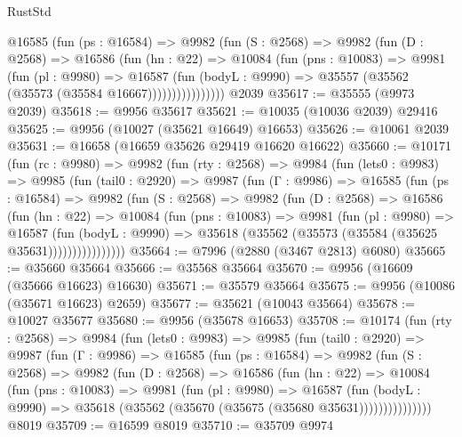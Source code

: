 \begin{lexlean}{RustStd}
\begin{coremodule}
              @16585
                (fun (ps : @16584) =>
                @9982
                  (fun (S : @2568) =>
                  @9982
                    (fun (D : @2568) =>
                    @16586
                      (fun (hn : @22) =>
                      @10084
                        (fun (pns : @10083) =>
                        @9981
                          (fun (pl : @9980) =>
                          @16587
                            (fun (bodyL : @9990) =>
                            @35557 (@35562 (@35573 (@35584 @16667))))))))))))))))
    @2039
@35617 := @35555 (@9973 @2039)
@35618 := @9956 @35617
@35621 := @10035 (@10036 @2039) @29416
@35625 := @9956 (@10027 (@35621 @16649) @16653)
@35626 := @10061 @2039
@35631 := @16658 (@16659 @35626 @29419 @16620 @16622)
@35660 := @10171
    (fun (rc : @9980) =>
    @9982
      (fun (rty : @2568) =>
      @9984
        (fun (lets0 : @9983) =>
        @9985
          (fun (tail0 : @2920) =>
          @9987
            (fun (Γ : @9986) =>
            @16585
              (fun (ps : @16584) =>
              @9982
                (fun (S : @2568) =>
                @9982
                  (fun (D : @2568) =>
                  @16586
                    (fun (hn : @22) =>
                    @10084
                      (fun (pns : @10083) =>
                      @9981
                        (fun (pl : @9980) =>
                        @16587
                          (fun (bodyL : @9990) =>
                          @35618 (@35562 (@35573 (@35584 (@35625 @35631))))))))))))))))
@35664 := @7996 (@2880 (@3467 @2813) @6080)
@35665 := @35660 @35664
@35666 := @35568 @35664
@35670 := @9956 (@16609 (@35666 @16623) @16630)
@35671 := @35579 @35664
@35675 := @9956 (@10086 (@35671 @16623) @2659)
@35677 := @35621 (@10043 @35664)
@35678 := @10027 @35677
@35680 := @9956 (@35678 @16653)
@35708 := @10174
    (fun (rty : @2568) =>
    @9984
      (fun (lets0 : @9983) =>
      @9985
        (fun (tail0 : @2920) =>
        @9987
          (fun (Γ : @9986) =>
          @16585
            (fun (ps : @16584) =>
            @9982
              (fun (S : @2568) =>
              @9982
                (fun (D : @2568) =>
                @16586
                  (fun (hn : @22) =>
                  @10084
                    (fun (pns : @10083) =>
                    @9981
                      (fun (pl : @9980) =>
                      @16587
                        (fun (bodyL : @9990) =>
                        @35618 (@35562 (@35670 (@35675 (@35680 @35631)))))))))))))))
    @8019
@35709 := @16599 @8019
@35710 := @35709 @9974

\end{coremodule}
\end{lexlean}
